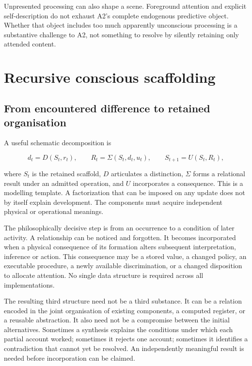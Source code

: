 \documentclass[
  11pt,
  a4paper,
]{article}
\begin{document}
Unpresented processing can also shape a scene. Foreground attention and
explicit self-description do not exhaust A2's complete endogenous
predictive object. Whether that object includes too much apparently
unconscious processing is a substantive challenge to A2, not something
to resolve by silently retaining only attended content.

\section{Recursive conscious
scaffolding}\label{recursive-conscious-scaffolding}

\subsection{From encountered difference to retained
organisation}\label{from-encountered-difference-to-retained-organization}

A useful schematic decomposition is

\[
d_t=D(S_t,r_t),\qquad R_t=\Sigma(S_t,d_t,u_t),\qquad S_{t+1}=U(S_t,R_t),
\]

where \(S_t\) is the retained scaffold, \(D\) articulates a distinction,
\(\Sigma\) forms a relational result under an admitted operation, and
\(U\) incorporates a consequence. This is a modelling template. A
factorization that can be imposed on any update does not by itself
explain development. The components must acquire independent physical or
operational meanings.

The philosophically decisive step is from an occurrence to a condition
of later activity. A relationship can be noticed and forgotten. It
becomes incorporated when a physical consequence of its formation alters
subsequent interpretation, inference or action. This consequence may be
a stored value, a changed policy, an executable procedure, a newly
available discrimination, or a changed disposition to allocate
attention. No single data structure is required across all
implementations.

The resulting third structure need not be a third substance. It can be a
relation encoded in the joint organisation of existing components, a
computed register, or a reusable abstraction. It also need not be a
compromise between the initial alternatives. Sometimes a synthesis
explains the conditions under which each partial account worked;
sometimes it rejects one account; sometimes it identifies a
contradiction that cannot yet be resolved. An independently meaningful
result is needed before incorporation can be claimed.
\end{document}
